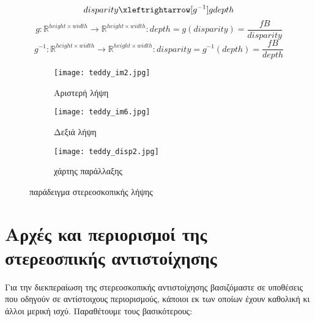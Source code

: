 $$disparity \xleftrightarrow[g^{-1}]{g} depth$$
$$ g:\mathbb{R}^{height \times width} \rightarrow \mathbb{R}^{height \times width} : depth = g(disparity) = \dfrac{fB}{disparity}$$
$$ g^{-1}:\mathbb{R}^{height \times width} \rightarrow \mathbb{R}^{height \times width} : disparity = g^{-1}(depth) = \dfrac{fB}{depth}$$

\begin{figure}
	\centering
	\begin{subfigure}{.32\textwidth}
		\texttt{[image: teddy\_im2.jpg]}
		\caption{Αριστερή λήψη}
	\end{subfigure}
	\begin{subfigure}{.32\textwidth}
		\texttt{[image: teddy\_im6.jpg]}
		\caption{Δεξιά λήψη}
	\end{subfigure}
	\begin{subfigure}{.32\textwidth}
		\texttt{[image: teddy\_disp2.jpg]}
		\caption{χάρτης παράλλαξης}
	\end{subfigure}
	\caption{παράδειγμα στερεοσκοπικής λήψης}
	\label{fig:teddy}
\end{figure}


\section{Αρχές και περιορισμοί της στερεοσπικής αντιστοίχησης} \label{sec:stereo_constraints}


Για την διεκπεραίωση της στερεοσκοπικής αντιστοίχησης βασιζόμαστε σε υποθέσεις που οδηγούν σε αντίστοιχους περιορισμούς, κάποιοι εκ των οποίων έχουν καθολική κι άλλοι μερική ισχύ.\cite{pollefeys2004visual} Παραθέτουμε τους βασικότερους:


